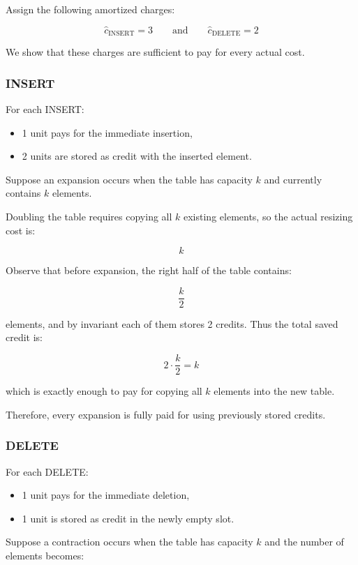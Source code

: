 \documentclass[12pt]{article}
\begin{document}
Assign the following amortized charges:

\[
\hat{c}_{\text{INSERT}} = 3
\qquad\text{and}\qquad
\hat{c}_{\text{DELETE}} = 2
\]

We show that these charges are sufficient to pay for every actual cost.

\subsubsection*{INSERT}

For each INSERT:

\begin{itemize}
    \item 1 unit pays for the immediate insertion,
    \item 2 units are stored as credit with the inserted element.
\end{itemize}

Suppose an expansion occurs when the table has capacity $k$ and currently contains $k$ elements.

Doubling the table requires copying all $k$ existing elements, so the actual resizing cost is:

\[
k
\]

Observe that before expansion, the right half of the table contains:

\[
\frac{k}{2}
\]

elements, and by invariant each of them stores 2 credits. Thus the total saved credit is:

\[
2 \cdot \frac{k}{2} = k
\]

which is exactly enough to pay for copying all $k$ elements into the new table.

Therefore, every expansion is fully paid for using previously stored credits.

\subsubsection*{DELETE}

For each DELETE:

\begin{itemize}
    \item 1 unit pays for the immediate deletion,
    \item 1 unit is stored as credit in the newly empty slot.
\end{itemize}

Suppose a contraction occurs when the table has capacity $k$ and the number of elements becomes:
\end{document}
